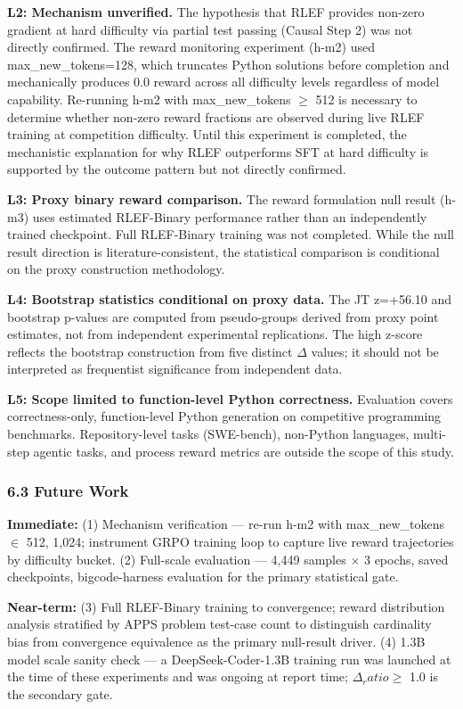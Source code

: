 \textbf{L2: Mechanism unverified.} The hypothesis that RLEF provides non-zero gradient at hard difficulty via partial test passing (Causal Step 2) was not directly confirmed. The reward monitoring experiment (h-m2) used max\_new\_tokens=128, which truncates Python solutions before completion and mechanically produces 0.0 reward across all difficulty levels regardless of model capability. Re-running h-m2 with max\_new\_tokens $\geq$ 512 is necessary to determine whether non-zero reward fractions are observed during live RLEF training at competition difficulty. Until this experiment is completed, the mechanistic explanation for why RLEF outperforms SFT at hard difficulty is supported by the outcome pattern but not directly confirmed.

\textbf{L3: Proxy binary reward comparison.} The reward formulation null result (h-m3) uses estimated RLEF-Binary performance rather than an independently trained checkpoint. Full RLEF-Binary training was not completed. While the null result direction is literature-consistent, the statistical comparison is conditional on the proxy construction methodology.

\textbf{L4: Bootstrap statistics conditional on proxy data.} The JT z=+56.10 and bootstrap p-values are computed from pseudo-groups derived from proxy point estimates, not from independent experimental replications. The high z-score reflects the bootstrap construction from five distinct $\Delta$ values; it should not be interpreted as frequentist significance from independent data.

\textbf{L5: Scope limited to function-level Python correctness.} Evaluation covers correctness-only, function-level Python generation on competitive programming benchmarks. Repository-level tasks (SWE-bench), non-Python languages, multi-step agentic tasks, and process reward metrics are outside the scope of this study.

\subsubsection{6.3 Future Work}

\textbf{Immediate:} (1) Mechanism verification --- re-run h-m2 with max\_new\_tokens $\in$ {512, 1,024}; instrument GRPO training loop to capture live reward trajectories by difficulty bucket. (2) Full-scale evaluation --- 4,449 samples $\times$ 3 epochs, saved checkpoints, bigcode-harness evaluation for the primary statistical gate.

\textbf{Near-term:} (3) Full RLEF-Binary training to convergence; reward distribution analysis stratified by APPS problem test-case count to distinguish cardinality bias from convergence equivalence as the primary null-result driver. (4) 1.3B model scale sanity check --- a DeepSeek-Coder-1.3B training run was launched at the time of these experiments and was ongoing at report time; $\Delta _ratio \geq$ 1.0 is the secondary gate.

